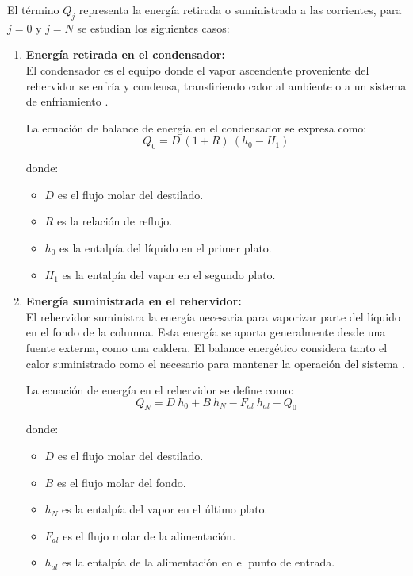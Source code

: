El término $Q_j$ representa la energía retirada o suministrada a las corrientes, para $j=0$ y $j=N$ se estudian los siguientes casos:
\begin{enumerate}
    \item \textbf{Energía retirada en el condensador:}\\
          El condensador es el equipo donde el vapor ascendente proveniente del rehervidor se enfría y condensa, transfiriendo calor al ambiente o a un sistema de enfriamiento \parencite{subsec5_5ref3}.

          La ecuación de balance de energía en el condensador se expresa como:
          $$
              Q_0 = D\ (1 + R)\ (h_0 - H_1)
          $$

          donde:
          \begin{itemize}
              \item $D$ es el flujo molar del destilado.
              \item $R$ es la relación de reflujo.
              \item $h_0$ es la entalpía del líquido en el primer plato.
              \item $H_1$ es la entalpía del vapor en el segundo plato.
          \end{itemize}

    \item \textbf{Energía suministrada en el rehervidor:}\\
          El rehervidor suministra la energía necesaria para vaporizar parte del líquido en el fondo de la columna. Esta energía se aporta generalmente desde una fuente externa, como una caldera. El balance energético considera tanto el calor suministrado como el necesario para mantener la operación del sistema \parencite{subsec5_5ref3}.

          La ecuación de energía en el rehervidor se define como:
          $$
              Q_N = D\ h_0 + B\ h_N - F_{al}\ h_{al} - Q_0
          $$

          donde:
          \begin{itemize}
              \item $D$ es el flujo molar del destilado.
              \item $B$ es el flujo molar del fondo.
              \item $h_N$ es la entalpía del vapor en el último plato.
              \item $F_{al}$ es el flujo molar de la alimentación.
              \item $h_{al}$ es la entalpía de la alimentación en el punto de entrada.
          \end{itemize}
\end{enumerate}

